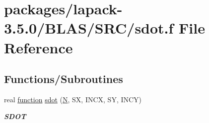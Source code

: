 \hypertarget{lapack-3_85_80_2BLAS_2SRC_2sdot_8f}{}\section{packages/lapack-\/3.5.0/\+B\+L\+A\+S/\+S\+R\+C/sdot.f File Reference}
\label{lapack-3_85_80_2BLAS_2SRC_2sdot_8f}
\subsection*{Functions/\+Subroutines}
\begin{DoxyCompactItemize}
\item 
real \hyperlink{afunc_8m_a7b5e596df91eadea6c537c0825e894a7}{function} \hyperlink{group__single__blas__level1_ga37a14d8598319955b711af0d64a6f56e}{sdot} (\hyperlink{polmisc_8c_a0240ac851181b84ac374872dc5434ee4}{N}, S\+X, I\+N\+C\+X, S\+Y, I\+N\+C\+Y)
\begin{DoxyCompactList}\small\item\em {\bfseries S\+D\+O\+T} \end{DoxyCompactList}\end{DoxyCompactItemize}
